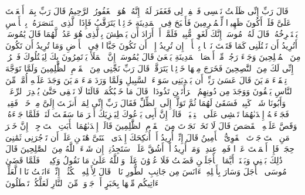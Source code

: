 \stopbuffer%
\startbuffer[\q:28:16]
قَالَ رَبِّ إِنِّی ظَلَمۡتُ نَفۡسِی فَٱغۡفِرۡ لِی فَغَفَرَ لَهُۥۤۚ إِنَّهُۥ هُوَ ٱلۡغَفُورُ ٱلرَّحِیمُ%
\stopbuffer%
\startbuffer[\q:28:17]
قَالَ رَبِّ بِمَاۤ أَنۡعَمۡتَ عَلَیَّ فَلَنۡ أَكُونَ ظَهِیرࣰا لِّلۡمُجۡرِمِینَ%
\stopbuffer%
\startbuffer[\q:28:18]
فَأَصۡبَحَ فِی ٱلۡمَدِینَةِ خَاۤئِفࣰا یَتَرَقَّبُ فَإِذَا ٱلَّذِی ٱسۡتَنصَرَهُۥ بِٱلۡأَمۡسِ یَسۡتَصۡرِخُهُۥۚ قَالَ لَهُۥ مُوسَىٰۤ إِنَّكَ لَغَوِیࣱّ مُّبِینࣱ%
\stopbuffer%
\startbuffer[\q:28:19]
فَلَمَّاۤ أَنۡ أَرَادَ أَن یَبۡطِشَ بِٱلَّذِی هُوَ عَدُوࣱّ لَّهُمَا قَالَ یَٰمُوسَىٰۤ أَتُرِیدُ أَن تَقۡتُلَنِی كَمَا قَتَلۡتَ نَفۡسَۢا بِٱلۡأَمۡسِۖ إِن تُرِیدُ إِلَّاۤ أَن تَكُونَ جَبَّارࣰا فِی ٱلۡأَرۡضِ وَمَا تُرِیدُ أَن تَكُونَ مِنَ ٱلۡمُصۡلِحِینَ%
\stopbuffer%
\startbuffer[\q:28:20]
وَجَاۤءَ رَجُلࣱ مِّنۡ أَقۡصَا ٱلۡمَدِینَةِ یَسۡعَىٰ قَالَ یَٰمُوسَىٰۤ إِنَّ ٱلۡمَلَأَ یَأۡتَمِرُونَ بِكَ لِیَقۡتُلُوكَ فَٱخۡرُجۡ إِنِّی لَكَ مِنَ ٱلنَّٰصِحِینَ%
\stopbuffer%
\startbuffer[\q:28:21]
فَخَرَجَ مِنۡهَا خَاۤئِفࣰا یَتَرَقَّبُۖ قَالَ رَبِّ نَجِّنِی مِنَ ٱلۡقَوۡمِ ٱلظَّٰلِمِینَ%
\stopbuffer%
\startbuffer[\q:28:22]
وَلَمَّا تَوَجَّهَ تِلۡقَاۤءَ مَدۡیَنَ قَالَ عَسَىٰ رَبِّیۤ أَن یَهۡدِیَنِی سَوَاۤءَ ٱلسَّبِیلِ%
\stopbuffer%
\startbuffer[\q:28:23]
وَلَمَّا وَرَدَ مَاۤءَ مَدۡیَنَ وَجَدَ عَلَیۡهِ أُمَّةࣰ مِّنَ ٱلنَّاسِ یَسۡقُونَ وَوَجَدَ مِن دُونِهِمُ ٱمۡرَأَتَیۡنِ تَذُودَانِۖ قَالَ مَا خَطۡبُكُمَاۖ قَالَتَا لَا نَسۡقِی حَتَّىٰ یُصۡدِرَ ٱلرِّعَاۤءُۖ وَأَبُونَا شَیۡخࣱ كَبِیرࣱ%
\stopbuffer%
\startbuffer[\q:28:24]
فَسَقَىٰ لَهُمَا ثُمَّ تَوَلَّىٰۤ إِلَى ٱلظِّلِّ فَقَالَ رَبِّ إِنِّی لِمَاۤ أَنزَلۡتَ إِلَیَّ مِنۡ خَیۡرࣲ فَقِیرࣱ%
\stopbuffer%
\startbuffer[\q:28:25]
فَجَاۤءَتۡهُ إِحۡدَىٰهُمَا تَمۡشِی عَلَى ٱسۡتِحۡیَاۤءࣲ قَالَتۡ إِنَّ أَبِی یَدۡعُوكَ لِیَجۡزِیَكَ أَجۡرَ مَا سَقَیۡتَ لَنَاۚ فَلَمَّا جَاۤءَهُۥ وَقَصَّ عَلَیۡهِ ٱلۡقَصَصَ قَالَ لَا تَخَفۡۖ نَجَوۡتَ مِنَ ٱلۡقَوۡمِ ٱلظَّٰلِمِینَ%
\stopbuffer%
\startbuffer[\q:28:26]
قَالَتۡ إِحۡدَىٰهُمَا یَٰۤأَبَتِ ٱسۡتَءۡجِرۡهُۖ إِنَّ خَیۡرَ مَنِ ٱسۡتَءۡجَرۡتَ ٱلۡقَوِیُّ ٱلۡأَمِینُ%
\stopbuffer%
\startbuffer[\q:28:27]
قَالَ إِنِّیۤ أُرِیدُ أَنۡ أُنكِحَكَ إِحۡدَى ٱبۡنَتَیَّ هَٰتَیۡنِ عَلَىٰۤ أَن تَأۡجُرَنِی ثَمَٰنِیَ حِجَجࣲۖ فَإِنۡ أَتۡمَمۡتَ عَشۡرࣰا فَمِنۡ عِندِكَۖ وَمَاۤ أُرِیدُ أَنۡ أَشُقَّ عَلَیۡكَۚ سَتَجِدُنِیۤ إِن شَاۤءَ ٱللَّهُ مِنَ ٱلصَّٰلِحِینَ%
\stopbuffer%
\startbuffer[\q:28:28]
قَالَ ذَٰلِكَ بَیۡنِی وَبَیۡنَكَۖ أَیَّمَا ٱلۡأَجَلَیۡنِ قَضَیۡتُ فَلَا عُدۡوَٰنَ عَلَیَّۖ وَٱللَّهُ عَلَىٰ مَا نَقُولُ وَكِیلࣱ%
\stopbuffer%
\startbuffer[\q:28:29]
۞ فَلَمَّا قَضَىٰ مُوسَى ٱلۡأَجَلَ وَسَارَ بِأَهۡلِهِۦۤ ءَانَسَ مِن جَانِبِ ٱلطُّورِ نَارࣰاۖ قَالَ لِأَهۡلِهِ ٱمۡكُثُوۤا۟ إِنِّیۤ ءَانَسۡتُ نَارࣰا لَّعَلِّیۤ ءَاتِیكُم مِّنۡهَا بِخَبَرٍ أَوۡ جَذۡوَةࣲ مِّنَ ٱلنَّارِ لَعَلَّكُمۡ تَصۡطَلُونَ%
